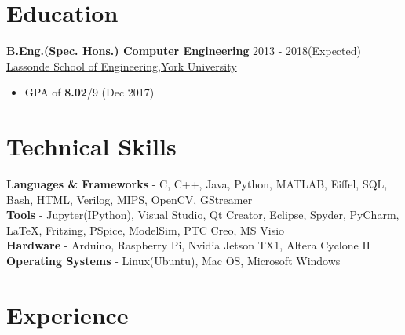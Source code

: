\documentclass[margin, centered]{res}
\begin{document}
\begin{resume}
\section{Education}
\textbf{B.Eng.(Spec. Hons.) Computer Engineering} \hfill 2013 - 2018(Expected) \\
\href{http://lassonde.yorku.ca/}{Lassonde School of Engineering,York University}
\begin{itemize}
	\item GPA of \textbf{8.02}/9 (Dec 2017)
\end{itemize}

\section{Technical \hspace{2mm} Skills}
\textbf{Languages \& Frameworks} - C, C++, Java, Python, MATLAB, Eiffel, SQL, Bash, HTML, Verilog, MIPS, OpenCV, GStreamer \\
\textbf{Tools} - Jupyter(IPython), Visual Studio, Qt Creator, Eclipse, Spyder, PyCharm, \LaTeX, Fritzing, PSpice, ModelSim, PTC Creo, MS Visio \\
\textbf{Hardware} - Arduino, Raspberry Pi, Nvidia Jetson TX1, Altera Cyclone II \\
\textbf{Operating Systems} - Linux(Ubuntu), Mac OS, Microsoft Windows
\section{Experience}


\end{resume}
\end{document}
